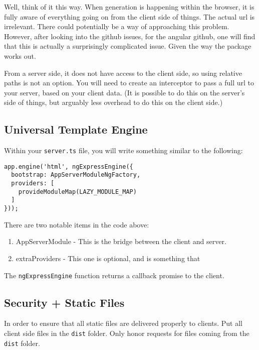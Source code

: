 Well, think of it this way. When generation is happening within the browser, it is fully aware of everything going on from the client side of things. The actual url is irrelevant. There could potentially be a way of approaching this problem. However, after looking into the github issues, for the angular github, one will find that this is actually a surprisingly complicated issue. Given the way the package works out. 

From a server side, it does not have access to the client side, so using relative paths is not an option. You will need to create an interceptor to pass a full url to your server, based on your client data. (It is possible to do this on the server's side of things, but arguably less overhead to do this on the client side.)

\subsection{Universal Template Engine}
Within your \lstinline{server.ts} file, you will write something similar to the following: 
\begin{lstlisting}[caption=server.ts]
app.engine('html', ngExpressEngine({
  bootstrap: AppServerModuleNgFactory,
  providers: [
    provideModuleMap(LAZY_MODULE_MAP)
  ]
}));
\end{lstlisting}

There are two notable items in the code above: 
\begin{enumerate}
  \item AppServerModule - This is the bridge between the client and server. 
  \item extraProviders - This one is optional, and is something that 
\end{enumerate}

The \lstinline{ngExpressEngine} function returns a callback promise to the client. 

\subsection{Security + Static Files}
In order to ensure that all static files are delivered properly to clients. Put all client side files in the \lstinline{dist} folder. Only honor requests for files coming from the \lstinline{dist} folder. 